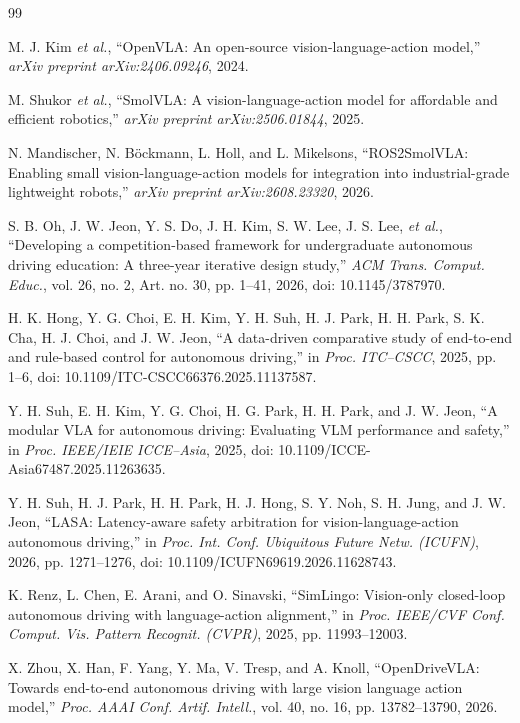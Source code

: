\documentclass[letterpaper,conference]{IEEEtran}
\begin{document}
\begin{thebibliography}{99}
\setlength{\itemsep}{0pt}
\setlength{\parsep}{0pt}

M. J. Kim \emph{et al.},
``OpenVLA: An open-source vision-language-action model,''
\emph{arXiv preprint arXiv:2406.09246}, 2024.

M. Shukor \emph{et al.},
``SmolVLA: A vision-language-action model for affordable and efficient robotics,''
\emph{arXiv preprint arXiv:2506.01844}, 2025.

N. Mandischer, N. B{\"o}ckmann, L. Holl, and L. Mikelsons,
``ROS2SmolVLA: Enabling small vision-language-action models for integration
into industrial-grade lightweight robots,''
\emph{arXiv preprint arXiv:2608.23320}, 2026.

S. B. Oh, J. W. Jeon, Y. S. Do, J. H. Kim, S. W. Lee, J. S. Lee,
\emph{et al.}, ``Developing a competition-based framework for undergraduate
autonomous driving education: A three-year iterative design study,''
\emph{ACM Trans. Comput. Educ.}, vol. 26, no. 2, Art. no. 30,
pp. 1--41, 2026, doi: 10.1145/3787970.

H. K. Hong, Y. G. Choi, E. H. Kim, Y. H. Suh, H. J. Park, H. H. Park,
S. K. Cha, H. J. Choi, and J. W. Jeon, ``A data-driven comparative study of
end-to-end and rule-based control for autonomous driving,'' in
\emph{Proc. ITC--CSCC}, 2025, pp. 1--6,
doi: 10.1109/ITC-CSCC66376.2025.11137587.

Y. H. Suh, E. H. Kim, Y. G. Choi, H. G. Park, H. H. Park, and J. W. Jeon,
``A modular VLA for autonomous driving: Evaluating VLM performance and
safety,'' in \emph{Proc. IEEE/IEIE ICCE--Asia}, 2025,
doi: 10.1109/ICCE-Asia67487.2025.11263635.

Y. H. Suh, H. J. Park, H. H. Park, H. J. Hong, S. Y. Noh, S. H. Jung,
and J. W. Jeon, ``LASA: Latency-aware safety arbitration for
vision-language-action autonomous driving,'' in \emph{Proc. Int. Conf.
Ubiquitous Future Netw. (ICUFN)}, 2026, pp. 1271--1276,
doi: 10.1109/ICUFN69619.2026.11628743.

K. Renz, L. Chen, E. Arani, and O. Sinavski,
``SimLingo: Vision-only closed-loop autonomous driving with language-action alignment,''
in \emph{Proc. IEEE/CVF Conf. Comput. Vis. Pattern Recognit. (CVPR)},
2025, pp. 11993--12003.

X. Zhou, X. Han, F. Yang, Y. Ma, V. Tresp, and A. Knoll,
``OpenDriveVLA: Towards end-to-end autonomous driving with large vision
language action model,'' \emph{Proc. AAAI Conf. Artif. Intell.}, vol. 40,
no. 16, pp. 13782--13790, 2026.


\end{thebibliography}
\end{document}
